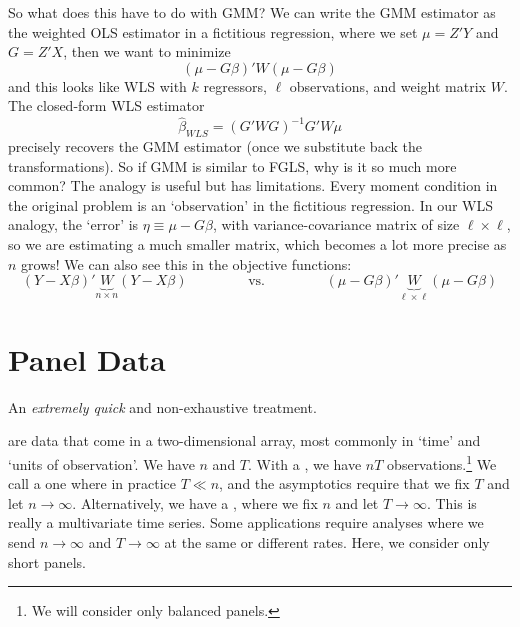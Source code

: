 \documentclass[10pt]{article}
\begin{document}
	So what does this have to do with GMM? We can write the GMM estimator as the weighted OLS estimator in a fictitious regression, where we set $\mu = Z'Y$ and $G = Z'X$, then we want to minimize \[(\mu - G\beta)'W(\mu - G\beta)\]and this looks like WLS with $k$ regressors, $\ell$ observations, and weight matrix $W$. The closed-form WLS estimator\[\hat{\beta}_{WLS} = (G'WG)^{-1} G'W\mu\]precisely recovers the GMM estimator (once we substitute back the transformations). So if GMM is similar to FGLS, why is it so much more common?  The analogy is useful but has limitations. Every moment condition in the original problem is an `observation' in the fictitious regression. In our WLS analogy, the `error' is $\eta \equiv \mu - G\beta$, with variance-covariance matrix of size $\ell \times \ell$, so we are estimating a much smaller matrix, which becomes a lot more precise as $n$ grows! We can also see this in the objective functions:
	\[
	(Y-X\beta)' \underbrace{W}_{n \times n}(Y - X\beta) \qquad\qquad \text{ vs. } \qquad\qquad (\mu - G\beta)'\underbrace{W}_{\ell \times \ell} (\mu - G\beta)
	\]


\newpage
\section{Panel Data}

\begin{remark}
	An \emph{extremely quick} and non-exhaustive treatment.
\end{remark}

\begin{definition}
	 are data that come in a two-dimensional array, most commonly in `time' and `units of observation'. We have  $n$ and  $T$. With a , we have $nT$ observations.\footnote{We will consider only balanced panels.} We call a  one where in practice $T \ll n$, and the asymptotics require that we fix $T$ and let $n \to \infty$. Alternatively, we have a , where we fix $n$ and let $T \to \infty$. This is really a multivariate time series. Some applications require analyses where we send $n\to\infty$ and $T \to\infty$ at the same or different rates. Here, we consider only short panels.
\end{definition}
\end{document}
